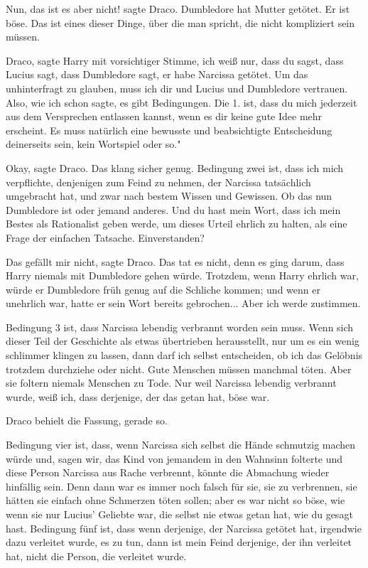 \glqq Nun, das ist es aber nicht!\grqq{} sagte Draco. \glqq Dumbledore hat
Mutter getötet. Er ist böse. Das ist eines dieser Dinge, über die man spricht,
die nicht kompliziert sein müssen.\grqq{}

\glqq Draco\grqq{}, sagte Harry mit vorsichtiger Stimme, \glqq ich weiß nur,
dass du sagst, dass Lucius sagt, dass Dumbledore sagt, er habe Narcissa getötet.
Um das unhinterfragt zu glauben, muss ich dir und Lucius und Dumbledore
vertrauen. Also, wie ich schon sagte, es gibt Bedingungen. Die 1. ist, dass du
mich jederzeit aus dem Versprechen entlassen kannst, wenn es dir keine gute Idee
mehr erscheint. Es muss natürlich eine bewusste und beabsichtigte Entscheidung
deinerseits sein, kein Wortspiel oder so."

\glqq Okay\grqq{}, sagte Draco. Das klang sicher genug. \glqq Bedingung zwei
ist, dass ich mich verpflichte, denjenigen zum Feind zu nehmen, der Narcissa
tatsächlich umgebracht hat, und zwar nach bestem Wissen und Gewissen. Ob das nun
Dumbledore ist oder jemand anderes. Und du hast mein Wort, dass ich mein Bestes
als Rationalist geben werde, um dieses Urteil ehrlich zu halten, als eine Frage
der einfachen Tatsache. Einverstanden?\grqq{}

\glqq Das gefällt mir nicht\grqq{}, sagte Draco. Das tat es nicht, denn es ging
darum, dass Harry niemals mit Dumbledore gehen würde. Trotzdem, wenn Harry
ehrlich war, würde er Dumbledore früh genug auf die Schliche kommen; und wenn er
unehrlich war, hatte er sein Wort bereits gebrochen... \glqq Aber ich werde
zustimmen.\grqq{}

\glqq Bedingung 3 ist, dass Narcissa lebendig verbrannt worden sein muss. Wenn
sich dieser Teil der Geschichte als etwas übertrieben herausstellt, nur um es
ein wenig schlimmer klingen zu lassen, dann darf ich selbst entscheiden, ob ich
das Gelöbnis trotzdem durchziehe oder nicht. Gute Menschen müssen manchmal
töten. Aber sie foltern niemals Menschen zu Tode. Nur weil Narcissa lebendig
verbrannt wurde, weiß ich, dass derjenige, der das getan hat, böse war.\grqq{}

Draco behielt die Fassung, gerade so.

\glqq Bedingung vier ist, dass, wenn Narcissa sich selbst die Hände schmutzig
machen würde und, sagen wir, das Kind von jemandem in den Wahnsinn folterte und
diese Person Narcissa aus Rache verbrennt, könnte die Abmachung wieder hinfällig
sein. Denn dann war es immer noch falsch für sie, sie zu verbrennen, sie hätten
sie einfach ohne Schmerzen töten sollen; aber es war nicht so böse, wie wenn sie
nur Lucius' Geliebte war, die selbst nie etwas getan hat, wie du gesagt hast.
Bedingung fünf ist, dass wenn derjenige, der Narcissa getötet hat, irgendwie
dazu verleitet wurde, es zu tun, dann ist mein Feind derjenige, der ihn
verleitet hat, nicht die Person, die verleitet wurde.\grqq{}

